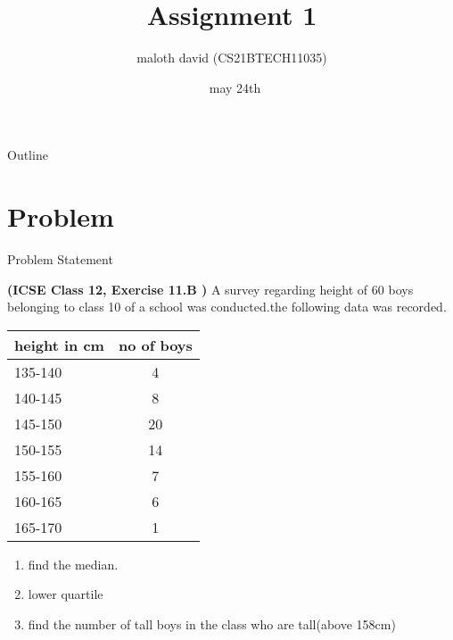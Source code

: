 \documentclass{beamer}
\title{Assignment 1}
\author{maloth david (CS21BTECH11035)}
\date{\ may 24th}
\begin{document}
\begin{frame}
    \titlepage 
\end{frame}

\begin{frame}{Outline}
    \tableofcontents
\end{frame}


\section{Problem}
\begin{frame}{Problem Statement}

\textbf{(ICSE Class 12, Exercise 11.B )} A survey regarding height of 60 boys belonging to class 10 of a school was conducted.the following data was recorded.
\begin{tabular}{|l|c|}
    \hline 
    height in cm&no of boys\\
    \hline
    135-140&4\\
    \hline
    140-145&8\\
    \hline
    145-150&20\\
    \hline
    150-155&14\\
    \hline
    155-160&7\\
    \hline
    160-165&6\\
    \hline
    165-170&1\\
    \hline
 \end{tabular}   

\begin{enumerate}[label=(\alph{enumi})]
	\item find the median.
	\item lower quartile
	\item find the number of tall boys in the class who are tall(above 158cm)
\end{enumerate}

\end{frame}


\end{document}
